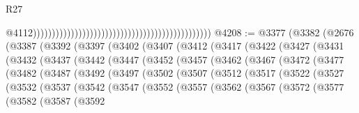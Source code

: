 \begin{lexlean}{R27}
\begin{coremodule}
                                                                                                  @4112)))))))))))))))))))))))))))))))))))))))))))))))
@4208 := @3377
    (@3382
      (@2676
        (@3387
          (@3392
            (@3397
              (@3402
                (@3407
                  (@3412
                    (@3417
                      (@3422
                        (@3427
                          (@3431
                            (@3432
                              (@3437
                                (@3442
                                  (@3447
                                    (@3452
                                      (@3457
                                        (@3462
                                          (@3467
                                            (@3472
                                              (@3477
                                                (@3482
                                                  (@3487
                                                    (@3492
                                                      (@3497
                                                        (@3502
                                                          (@3507
                                                            (@3512
                                                              (@3517
                                                                (@3522
                                                                  (@3527
                                                                    (@3532
                                                                      (@3537
                                                                        (@3542
                                                                          (@3547
                                                                            (@3552
                                                                              (@3557
                                                                                (@3562
                                                                                  (@3567
                                                                                    (@3572
                                                                                      (@3577
                                                                                        (@3582
                                                                                          (@3587
                                                                                            (@3592

\end{coremodule}
\end{lexlean}
